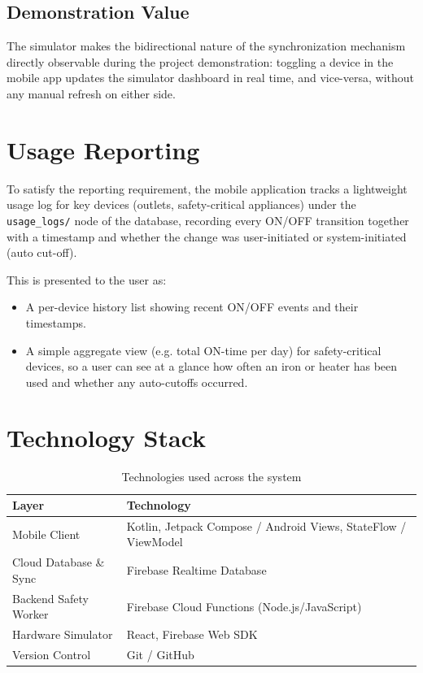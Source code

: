 \documentclass[11pt,a4paper]{article}
\begin{document}
\subsection{Demonstration Value}
The simulator makes the bidirectional nature of the synchronization mechanism directly observable during the project demonstration: toggling a device in the mobile app updates the simulator dashboard in real time, and vice-versa, without any manual refresh on either side.

\newpage
\section{Usage Reporting}

To satisfy the reporting requirement, the mobile application tracks a lightweight usage log for key devices (outlets, safety-critical appliances) under the \texttt{usage\_logs/} node of the database, recording every ON/OFF transition together with a timestamp and whether the change was user-initiated or system-initiated (auto cut-off).

This is presented to the user as:
\begin{itemize}
    \item A per-device history list showing recent ON/OFF events and their timestamps.
    \item A simple aggregate view (e.g. total ON-time per day) for safety-critical devices, so a user can see at a glance how often an iron or heater has been used and whether any auto-cutoffs occurred.
\end{itemize}

\newpage
\section{Technology Stack}

\begin{table}[h!]
\centering
\begin{tabularx}{\textwidth}{lX}
\toprule
\textbf{Layer} & \textbf{Technology} \\
\midrule
Mobile Client & Kotlin, Jetpack Compose / Android Views, StateFlow / ViewModel \\
Cloud Database \& Sync & Firebase Realtime Database \\
Backend Safety Worker & Firebase Cloud Functions (Node.js/JavaScript) \\
Hardware Simulator & React, Firebase Web SDK \\
Version Control & Git / GitHub \\
\bottomrule
\end{tabularx}
\caption{Technologies used across the system}
\end{table}
\end{document}
